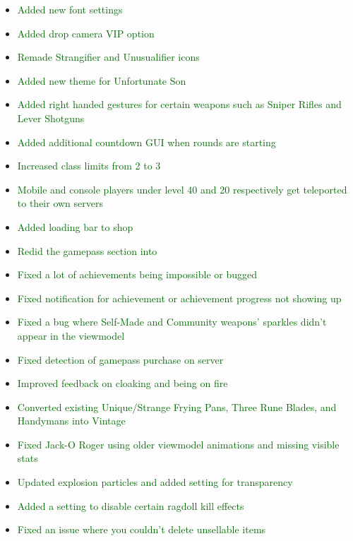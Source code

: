 \documentclass{article}
\begin{document}
\begin{itemize}
    \item \textcolor{darkgreen}{Added new font settings}
    \item \textcolor{darkgreen}{Added drop camera VIP option}
    \item \textcolor{darkgreen}{Remade Strangifier and Unusualifier icons}
    \item \textcolor{darkgreen}{Added new theme for Unfortunate Son}
    \item \textcolor{darkgreen}{Added right handed gestures for certain weapons such as Sniper Rifles and Lever Shotguns}
    \item \textcolor{darkgreen}{Added additional countdown GUI when rounds are starting}
    \item \textcolor{darkgreen}{Increased class limits from 2 to 3}
    \item \textcolor{darkgreen}{Mobile and console players under level 40 and 20 respectively get teleported to their own servers}
    \item \textcolor{darkgreen}{Added loading bar to shop}
    \item \textcolor{darkgreen}{Redid the gamepass section into}
    \item \textcolor{darkgreen}{Fixed a lot of achievements being impossible or bugged}
    \item \textcolor{darkgreen}{Fixed notification for achievement or achievement progress not showing up}
    \item \textcolor{darkgreen}{Fixed a bug where Self-Made and Community weapons’ sparkles didn’t appear in the viewmodel}
    \item \textcolor{darkgreen}{Fixed detection of gamepass purchase on server}
    \item \textcolor{darkgreen}{Improved feedback on cloaking and being on fire}
    \item \textcolor{darkgreen}{Converted existing Unique/Strange Frying Pans, Three Rune Blades, and Handymans into Vintage}
    \item \textcolor{darkgreen}{Fixed Jack-O Roger using older viewmodel animations and missing visible stats}
    \item \textcolor{darkgreen}{Updated explosion particles and added setting for transparency}
    \item \textcolor{darkgreen}{Added a setting to disable certain ragdoll kill effects}
    \item \textcolor{darkgreen}{Fixed an issue where you couldn’t delete unsellable items}

\end{itemize}
\end{document}
